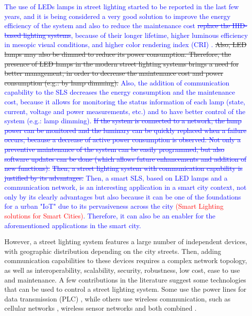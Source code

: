 \documentclass[authoryear,preprint,review,12pt]{elsarticle}
\newcommand{\rev}{\textcolor{blue}}
\newcommand{\refs}{\textcolor{red}}
\begin{document}
\rev{The use of LEDs lamps in street lighting started to be reported in the last few years, and it is being considered a very good solution to improve the energy efficiency of the system and also to reduce the maintenance cost \sout{replace the HID-based lighting systems}, because of their longer lifetime, higher luminous efficiency in mesopic visual conditions, and higher color rendering index (CRI) \citep{CRI_2008,CRI_2010}.} \sout{Also, LED lamps may also be dimmed to reduce its power consumption.
Therefore, the presence of LED lamps in the modern street lighting systems brings a need for better management, in order to decrease the maintenance cost and power consumption (e.g.: by lamp dimming).} \rev{Also, the addition of communication capability to the SLS decreases the energy consumption and the maintenance cost, because it allows for monitoring the status information of each lamp (state, current, voltage and power measurements, etc.) and to have better control of the system (e.g.: lamp dimming). \sout{If the system is connected to a network, the lamp power can be monitored and the luminary can be quickly replaced when a failure occurs, because a decrease of active power consumption is observed. Not only a preventive maintenance of the system can be easily programmed, but also software updates can be done (which allows future enhancements and addition of new functions).}  \sout{Then, a street lighting system with communication capability is justified by its advantages.} Then, a smart SLS, based on LED lamps and a communication network, is an interesting application in a smart city context, not only by its clearly advantages but also because it can be one of the foundations for a urban "IoT" due to its pervasiveness across the city \refs{(Smart Lighting solutions for Smart Cities)}. Therefore, it can also be an enabler for the aforementioned applications in the smart city.}

However, a street lighting system features a large number of independent devices, with geographic distribution depending on the city streets. Then, adding communication capabilities to these devices requires a complex network topology, as well as interoperability, scalability, security, robustness, low cost, ease to use and maintenance. A few contributions in the literature suggest some technologies that can be used to control a street lighting system. Some use the power lines for data transmission (PLC) \citep{PLC_Street_Lighting_2003,PLC_Street_Lighting_2006}, while others use wireless communication, such as cellular networks \citep{Cellular_Street_Lighting_2009_1,Cellular_Street_Lighting_2010_1}, wireless sensor networks \citep{WSN_Street_Lighting_2010_1, WSN_Street_Lighting_2010_2} and both combined \citep{WSN_Street_lighting_2006, WSN_Street_lighting_2007}.
\end{document}
